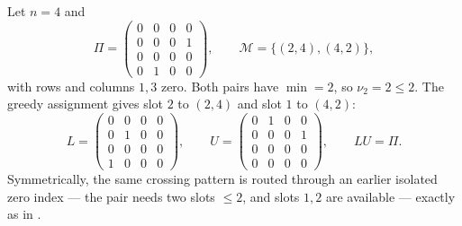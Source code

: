 \documentclass[preprint,12pt]{elsarticle}
\theoremstyle{plain}
\theoremstyle{nonumberplain}
\numberwithin{equation}{section}
\newcommand{\M}{\mathcal{M}}
\numberwithin{theorem}{section}
\begin{document}
\begin{example}\label{ex:crossing}
  Let $n = 4$ and
  \[
    \Pi =
    \begin{pmatrix}
      0 & 0 & 0 & 0\\
      0 & 0 & 0 & 1\\
      0 & 0 & 0 & 0\\
      0 & 1 & 0 & 0
    \end{pmatrix},
    \qquad
    \M = \{(2,4), (4,2)\},
  \]
  with rows and columns $1,3$ zero.  Both pairs have $\min=2$, so
  $\nu_2=2\le2$.  The greedy assignment gives slot $2$ to $(2,4)$ and slot
  $1$ to $(4,2)$:
  \[
    L =
    \begin{pmatrix}
      0 & 0 & 0 & 0\\
      0 & 1 & 0 & 0\\
      0 & 0 & 0 & 0\\
      1 & 0 & 0 & 0
    \end{pmatrix},
    \qquad
    U =
    \begin{pmatrix}
      0 & 1 & 0 & 0\\
      0 & 0 & 0 & 1\\
      0 & 0 & 0 & 0\\
      0 & 0 & 0 & 0
    \end{pmatrix},
    \qquad
    LU = \Pi .
  \]
  Symmetrically, the same crossing pattern is routed through an earlier
  isolated zero index --- the pair needs two slots $\le 2$, and slots
  $1, 2$ are available --- exactly as in .
\end{example}

\clearpage
{}


\end{document}
